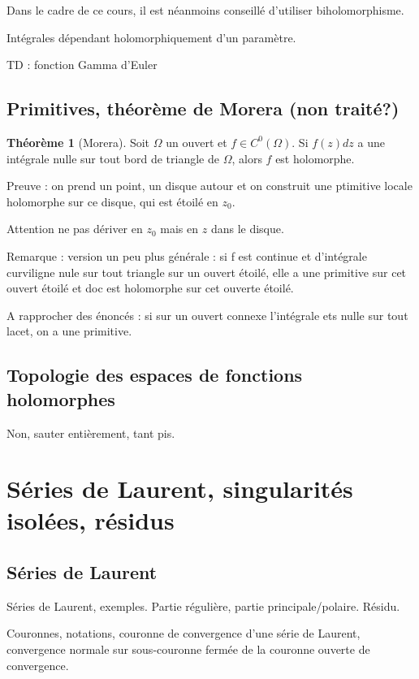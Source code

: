 \documentclass[11pt,a4paper]{book}
\theoremstyle{definition}
\newtheorem{theoreme}{Th\'eor\`eme}[section]
\theoremstyle{plain}
\begin{document}
Dans le cadre de ce cours, il est néanmoins conseillé d'utiliser \og biholomorphisme\fg{}.

Intégrales dépendant holomorphiquement d'un paramètre.

TD : fonction Gamma d'Euler


\section{Primitives, théorème de Morera (non traité?)}

\begin{theoreme}[Morera]
Soit $\Omega$ un ouvert et $f \in C^0(\Omega)$.
Si $f(z)dz$ a une intégrale nulle sur tout bord de triangle de $\Omega$, alors $f$ est holomorphe.
\end{theoreme}

Preuve : on prend un point, un disque autour et on construit une ptimitive locale holomorphe sur ce disque, qui est étoilé en $z_0$.

Attention ne pas dériver en $z_0$ mais en $z$ dans le disque.

Remarque  : version un peu plus générale : si f est continue et d'intégrale curviligne nule sur tout triangle sur un ouvert étoilé, elle a une primitive sur cet ouvert étoilé et doc est holomorphe sur cet ouverte étoilé.

A rapprocher des énoncés : si sur un ouvert connexe l'intégrale ets nulle sur tout lacet, on a une primitive.


\section{Topologie des espaces de fonctions holomorphes}

Non, sauter entièrement, tant pis.


\chapter{Séries de Laurent, singularités isolées, résidus}


\section{Séries de Laurent}

Séries de Laurent, exemples.
Partie régulière, partie principale/polaire. 
Résidu.


Couronnes, notations, couronne de convergence d'une série de Laurent, convergence normale sur sous-couronne fermée de la couronne ouverte de convergence.
\end{document}
